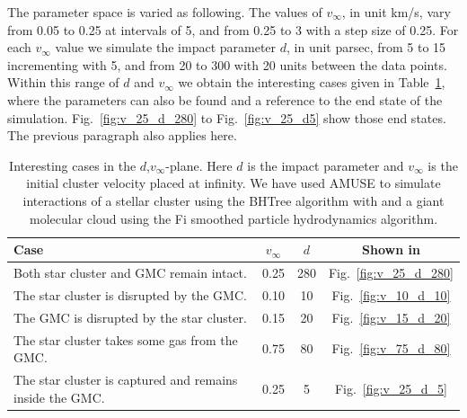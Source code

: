 \documentclass{aa}
\begin{document}
The parameter space is varied as following. The values of $v_\infty$, in unit km/s, vary from 0.05 to 0.25 at intervals of 5, and from 0.25 to 3 with a step size of 0.25. For each $v_\infty$ value we simulate the impact parameter $d$, in unit parsec, from 5 to 15 incrementing with 5, and from 20 to 300 with 20 units between the data points. Within this range of $d$ and $v_\infty$ we obtain the interesting cases given in Table~\ref{tab:cases}, where the parameters can also be found and a reference to the end state of the simulation. Fig.~\ref{fig:v_25_d_280} to Fig.~\ref{fig:v_25_d5} show those end states. The previous paragraph also applies here.


\begin{table}
    \caption{Interesting cases in the $d$,$v_\infty$-plane. Here $d$ is the impact parameter and $v_\infty$ is the initial cluster velocity placed at infinity. We have used AMUSE to simulate interactions of a stellar cluster using the BHTree algorithm with and a giant molecular cloud using the Fi smoothed particle hydrodynamics algorithm.}
    \label{tab:cases}
    \centering
    \begin{tabular}{l c c c}
        \hline\hline
        Case & $v_\infty$ & $d$ & Shown in \\
        \hline
        Both star cluster and GMC remain intact. & 0.25 & 280 & Fig.~\ref{fig:v_25_d_280} \\
        The star cluster is disrupted by the GMC. & 0.10 & 10 & Fig.~\ref{fig:v_10_d_10} \\
        The GMC is disrupted by the star cluster. & 0.15 & 20 & Fig.~\ref{fig:v_15_d_20} \\
        The star cluster takes some gas from the GMC. & 0.75 & 80 & Fig.~\ref{fig:v_75_d_80} \\
        The star cluster is captured and remains inside the GMC. & 0.25 & 5 & Fig.~\ref{fig:v_25_d_5} \\
        \hline
    \end{tabular}
\end{table}
\end{document}
